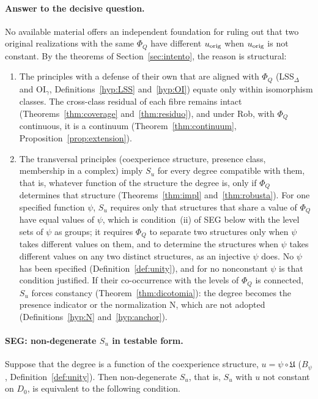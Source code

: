 \paragraph{Answer to the decisive question.} No available material offers an independent foundation for ruling out that two original realizations with the same $\Phi_Q$ have different $u_{\rm orig}$ when $u_{\rm orig}$ is not constant. By the theorems of Section~\ref{sec:intento}, the reason is structural:
\begin{enumerate}
\item The principles with a defense of their own that are aligned with $\Phi_Q$ (LSS$_\Delta$ and OI$_\gamma$, Definitions~\ref{hyp:LSS} and~\ref{hyp:OI}) equate only within isomorphism classes. The cross-class residual of each fibre remains intact (Theorems~\ref{thm:coverage} and~\ref{thm:residuo}), and under Rob, with $\Phi_Q$ continuous, it is a continuum (Theorem~\ref{thm:continuum}, Proposition~\ref{prop:extension}).
\item The transversal principles (coexperience structure, presence class, membership in a complex) imply $S_u$ for every degree compatible with them, that is, whatever function of the structure the degree is, only if $\Phi_Q$ determines that structure (Theorems~\ref{thm:impl} and~\ref{thm:robusta}). For one specified function $\psi$, $S_u$ requires only that structures that share a value of $\Phi_Q$ have equal values of $\psi$, which is condition~(ii) of SEG below with the level sets of $\psi$ as groups; it requires $\Phi_Q$ to separate two structures only when $\psi$ takes different values on them, and to determine the structures when $\psi$ takes different values on any two distinct structures, as an injective $\psi$ does. No $\psi$ has been specified (Definition~\ref{def:unity}), and for no nonconstant $\psi$ is that condition justified. If their co-occurrence with the levels of $\Phi_Q$ is connected, $S_u$ forces constancy (Theorem~\ref{thm:dicotomia}): the degree becomes the presence indicator or the normalization N, which are not adopted (Definitions~\ref{hyp:N} and~\ref{hyp:anchor}).
\end{enumerate}

\paragraph{SEG: non-degenerate $S_u$ in testable form.} Suppose that the degree is a function of the coexperience structure, $u=\psi\circ\mathfrak U$ ($B_\psi$, Definition~\ref{def:unity}). Then non-degenerate $S_u$, that is, $S_u$ with $u$ not constant on $D_0$, is equivalent to the following condition.

